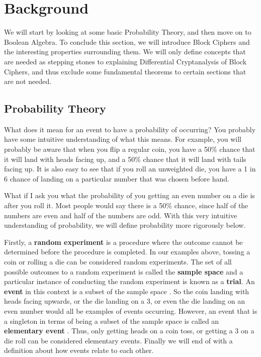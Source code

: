 



\chapter{Background} \label{c:background}

We will start by looking at some basic Probability Theory, and then move on to
Boolean Algebra. To conclude this section, we will introduce Block Ciphers and
the interesting properties surrounding them. We will only define concepts that
are needed as stepping stones to explaining Differential Cryptanalysis of Block
Ciphers, and thus exclude some fundamental theorems to certain sections that
are not needed. 

\section{Probability Theory}

What does it mean for an event to have a probability of occurring? You probably
have some intuitive understanding of what this means. For example, you will
probably be aware that when you flip a regular coin, you have a 50\% chance
that it will land with heads facing up, and a 50\% chance that it will land
with tails facing up. It is also easy to see that if you roll an unweighted
die, you have a 1 in 6 chance of landing on a particular number that was chosen
before hand.

What if I ask you what the probability of you getting an even number on a die
is after you roll it. Most people would say there is a 50\% chance, since half
of the numbers are even and half of the numbers are odd. With this very
intuitive understanding of probability, we will define probability more
rigorously below.

Firstly, a \textbf{random experiment} is a procedure where the outcome cannot
be determined before the procedure is completed. In our examples above, tossing
a coin or rolling a die can be considered random experiments.  The set of all
possible outcomes to a random experiment is called the \textbf{sample space}
and a particular instance of conducting the random experiment is known as a
\textbf{trial}. An \textbf{event} in this context is a subset of the sample
space \cite[p.~57]{IntroStat}. So the coin landing with heads facing upwards,
or the die landing on a 3, or even the die landing on an even number would all
be examples of events occurring. However, an event that is a singleton in terms
of being a subset of the sample space is called an \textbf{elementary event}
\cite[p.~58]{IntroStat}.  Thus, only getting heads on a coin toss, or getting a
3 on a die roll can be considered elementary events. Finally we will end of
with a definition about how events relate to each other.

